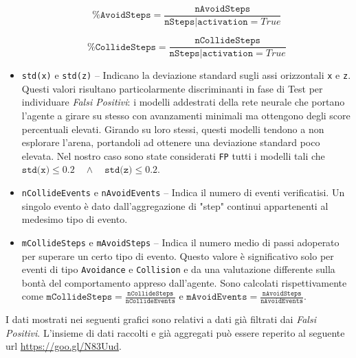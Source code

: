 \begin{itemize}
    $$\texttt{\%AvoidSteps} = \frac{\texttt{nAvoidSteps}}{\texttt{nSteps} | \texttt{activation}=True}$$
    
    $$\texttt{\%CollideSteps} = \frac{\texttt{nCollideSteps}}{\texttt{nSteps} | \texttt{activation}=True}$$
   
    \item \texttt{std(x)} e \texttt{std(z)} -- Indicano la deviazione standard sugli assi orizzontali \texttt{x} e \texttt{z}. Questi valori risultano particolarmente discriminanti in fase di Test per individuare \textit{Falsi Positivi}: i modelli addestrati della rete neurale che portano l'agente a girare su stesso con avanzamenti minimali ma ottengono degli score percentuali elevati. Girando su loro stessi, questi modelli tendono a non esplorare l'arena, portandoli ad ottenere una deviazione standard poco elevata. Nel nostro caso sono state considerati \texttt{FP} tutti i modelli tali che $\texttt{std(x)} \le 0.2 \quad\wedge\quad \texttt{std(z)} \le 0.2$.
    
    \item \texttt{nCollideEvents} e \texttt{nAvoidEvents} -- Indica il numero di eventi verificatisi. Un singolo evento è dato dall'aggregazione di "step" continui appartenenti al medesimo tipo di evento.
    
    \item \texttt{mCollideSteps} e \texttt{mAvoidSteps} -- Indica il numero medio di passi adoperato per superare un certo tipo di evento. Questo valore è significativo solo per eventi di tipo \texttt{Avoidance} e \texttt{Collision} e da una valutazione differente sulla bontà del comportamento appreso dall'agente. Sono calcolati rispettivamente come $\texttt{mCollideSteps} = \frac{\texttt{nCollideSteps}}{\texttt{nCollideEvents}}$ e $\texttt{mAvoidEvents} = \frac{\texttt{nAvoidSteps}}{\texttt{nAvoidEvents}}$.
    
\end{itemize}

I dati mostrati nei seguenti grafici sono relativi a dati già filtrati dai \textit{Falsi Positivi}. L'insieme di dati raccolti e già aggregati può essere reperito al seguente url \url{https://goo.gl/N83Uud}. 

